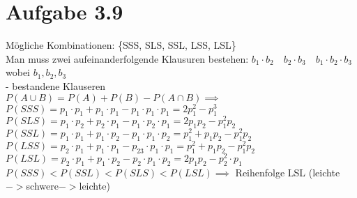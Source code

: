 \documentclass{article}
\begin{document}
		\section*{Aufgabe 3.9}
		Mögliche Kombinationen: \{SSS, SLS, SSL, LSS, LSL\} \\
		\newline 
		Man muss zwei aufeinanderfolgende
		Klausuren bestehen: $b_{1} \cdot b_{2} \quad b_{2} \cdot b_{3} \quad b_{1} \cdot b_{2} \cdot b_{3}$ wobei $b_{1}, b_{2}, b_{3}$ \\
		- bestandene Klauseren \\
		\newline 
		$P(A \cup B) = P(A) + P(B) - P(A \cap B) \implies $ \\
		\newline
		$P(SSS) = p_{1} \cdot p_{1} + p_{1} \cdot p_{1} - p_{1} \cdot p_{1} \cdot p_{1} = 2p_{1}^2 - p_{1}^3 $ \\
		\newline
		$P(SLS) = p_{1} \cdot p_{2} + p_{2} \cdot p_{1} - p_{1} \cdot p_{2} \cdot p_{1} = 2p_{1}p_{2} - p_{1}^2p_{2} $ \\
		\newline
		$P(SSL) = p_{1} \cdot p_{1} + p_{1} \cdot p_{2} - p_{1} \cdot p_{1} \cdot p_{2} = p_{1}^2 + p_{1}p_{2} - p_{1}^2p_{2} $ \\
		\newline
		$P(LSS) = p_{2} \cdot p_{1} + p_{1} \cdot p_{1} - p_{23} \cdot p_{1} \cdot p_{1} = p_{1}^2 + p_{1}p_{2} - p_{1}^2p_{2} $ \\
		\newline
		$P(LSL) = p_{2} \cdot p_{1} + p_{1} \cdot p_{2} - p_{2} \cdot p_{1} \cdot p_{2} = 2p_{1}p_{2} - p_{2}^2 \cdot p_{1} $ \\
		\newline
		$P(SSS) < P(SSL) < P(SLS) < P(LSL) \implies$  Reihenfolge LSL (leichte$->$schwere$->$leichte)
		
\end{document}
